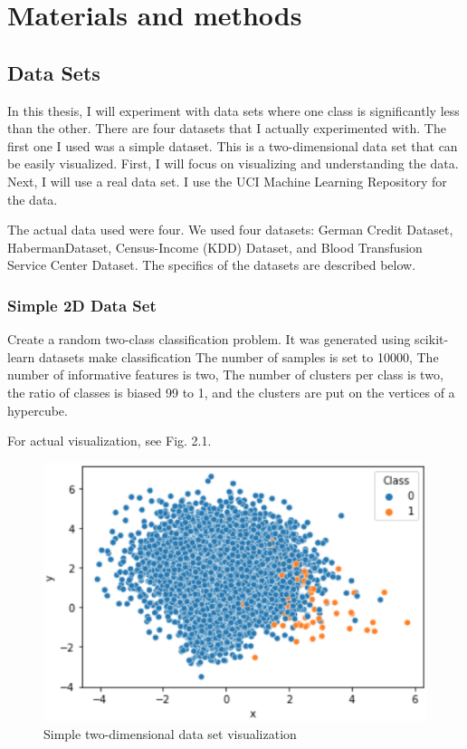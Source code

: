 \chapter{Materials and methods}
\section{Data Sets}

In this thesis, I will experiment with data sets where one class is significantly less than the other.
There are four datasets that I actually experimented with.
The first one I used was a simple dataset. This is a two-dimensional data set that can be easily visualized.
First, I will focus on visualizing and understanding the data.
Next, I will use a real data set. I use the UCI Machine Learning Repository\cite{UCI} for the data.

The actual data used were four.
We used four datasets: German Credit Dataset, HabermanDataset, Census-Income (KDD) Dataset, and Blood Transfusion Service Center Dataset.
The specifics of the datasets are described below.

\subsection{Simple 2D Data Set}
Create a random two-class classification problem.
It was generated using scikit-learn datasets make classification
The number of samples is set to 10000, The number of informative features is two,
The number of clusters per class is two, the ratio of classes is biased 99 to 1, and the clusters are put on the vertices of a hypercube.

For actual visualization, see Fig. 2.1.
\begin{center}
    \begin{figure}[ht]
        \caption{Simple two-dimensional data set visualization}
        \label{tab:team-rating-features}
        \begin{center}
            \includegraphics[scale=0.8]{image/data1.eps}
        \end{center}
    \end{figure}
\end{center}

